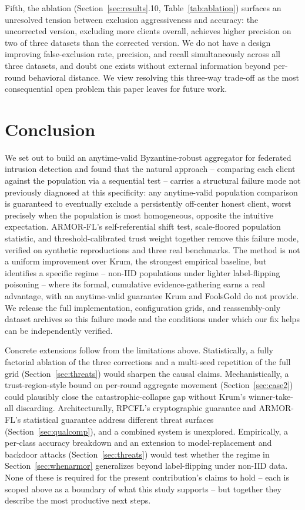\documentclass[pdflatex,iicol,sn-mathphys-num]{sn-jnl}%
\theoremstyle{thmstyleone}%
\theoremstyle{thmstyletwo}%
\theoremstyle{thmstylethree}%
\begin{document}
Fifth, the ablation (Section~\ref{sec:results}.10, Table~\ref{tab:ablation}) surfaces an unresolved tension between exclusion aggressiveness and accuracy: the uncorrected version, excluding more clients overall, achieves higher precision on two of three datasets than the corrected version. We do not have a design improving false-exclusion rate, precision, and recall simultaneously across all three datasets, and doubt one exists without external information beyond per-round behavioral distance. We view resolving this three-way trade-off as the most consequential open problem this paper leaves for future work.

\section{Conclusion}\label{sec:conclusion}

We set out to build an anytime-valid Byzantine-robust aggregator for federated intrusion detection and found that the natural approach -- comparing each client against the population via a sequential test -- carries a structural failure mode not previously diagnosed at this specificity: any anytime-valid population comparison is guaranteed to eventually exclude a persistently off-center honest client, worst precisely when the population is most homogeneous, opposite the intuitive expectation. ARMOR-FL's self-referential shift test, scale-floored population statistic, and threshold-calibrated trust weight together remove this failure mode, verified on synthetic reproductions and three real benchmarks. The method is not a uniform improvement over Krum, the strongest empirical baseline, but identifies a specific regime -- non-IID populations under lighter label-flipping poisoning -- where its formal, cumulative evidence-gathering earns a real advantage, with an anytime-valid guarantee Krum and FoolsGold do not provide. We release the full implementation, configuration grids, and reassembly-only dataset archives so this failure mode and the conditions under which our fix helps can be independently verified.

Concrete extensions follow from the limitations above. Statistically, a fully factorial ablation of the three corrections and a multi-seed repetition of the full grid (Section~\ref{sec:threats}) would sharpen the causal claims. Mechanistically, a trust-region-style bound on per-round aggregate movement (Section~\ref{sec:case2}) could plausibly close the catastrophic-collapse gap without Krum's winner-take-all discarding. Architecturally, RPCFL's cryptographic guarantee \citep{chen2026rpcfl} and ARMOR-FL's statistical guarantee address different threat surfaces (Section~\ref{sec:qualcomp}), and a combined system is unexplored. Empirically, a per-class accuracy breakdown and an extension to model-replacement and backdoor attacks (Section~\ref{sec:threats}) would test whether the regime in Section~\ref{sec:whenarmor} generalizes beyond label-flipping under non-IID data. None of these is required for the present contribution's claims to hold -- each is scoped above as a boundary of what this study supports -- but together they describe the most productive next steps.
\end{document}
